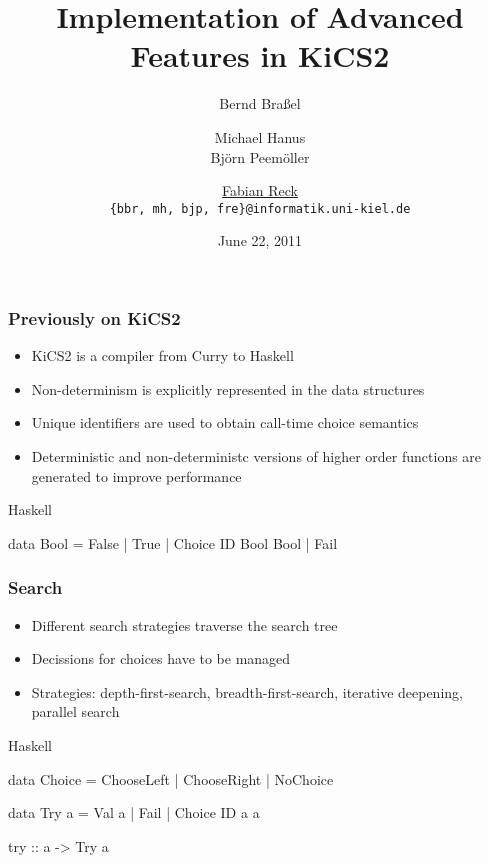 \documentclass[utf8]{beamer}
\newenvironment{program}{\begin{semiverbatim}\small}{\end{semiverbatim}}
\begin{document}
\title[KiCS2]{Implementation of Advanced Features in KiCS2}

\date{June 22, 2011}

\author[B. Braßel, M. Hanus, B. Peemöller,  \underline{F. Reck}]
 {Bernd Braßel \and Michael Hanus \\
   Björn Peemöller \and \underline{Fabian Reck}\\
  \texttt{\{bbr, mh, bjp, fre\}@informatik.uni-kiel.de}}


\begin{frame}
\titlepage
\end{frame}

\begin{frame}[fragile]
\frametitle{Previously on KiCS2}
\begin{itemize}
\item KiCS2 is a compiler from Curry to Haskell
\item Non-determinism is explicitly represented in
      the data structures
\item Unique identifiers are used to obtain
      call-time choice semantics
\item Deterministic and non-deterministc versions
      of higher order functions are generated to
      improve performance
\end{itemize}

\begin{block}{Haskell}
\begin{program}
data Bool = False | True | Choice ID Bool Bool | Fail
\end{program}
\end{block}
\end{frame}

\begin{frame}[fragile]
\frametitle{Search}

\begin{itemize}
 \item Different search strategies traverse the search tree
 \item Decissions for choices have to be managed
 \item Strategies: depth-first-search, breadth-first-search,
       iterative deepening, parallel search
\end{itemize}

\begin{block}{Haskell}
\begin{program}
data Choice = ChooseLeft
            | ChooseRight
            | NoChoice

data Try a = Val a
           | Fail
           | Choice ID a a

try :: a -> Try a
\end{program}
\end{block}

\end{frame}
\end{document}
